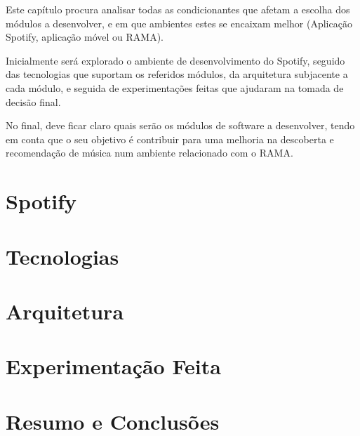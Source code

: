 Este capítulo procura analisar todas as condicionantes que afetam a escolha  dos módulos a desenvolver, e em que ambientes estes se encaixam melhor (Aplicação Spotify, aplicação móvel ou RAMA).

Inicialmente será explorado o ambiente de desenvolvimento do Spotify, seguido das tecnologias que suportam os referidos módulos, da arquitetura subjacente a cada módulo, e seguida de experimentações feitas que ajudaram na tomada de decisão final.

No final, deve ficar claro quais serão os módulos de software a desenvolver, tendo em conta que o seu objetivo é contribuir para uma melhoria na descoberta e recomendação de música num ambiente relacionado com o RAMA.


\section{Spotify} %
\label{sec:spotify}



\section{Tecnologias} %
\label{sec:tecnologias}


\section{Arquitetura} %
\label{sec:arquitetura}



\section{Experimentação Feita} %
\label{sec:experimentacao}


\section{Resumo e Conclusões}


